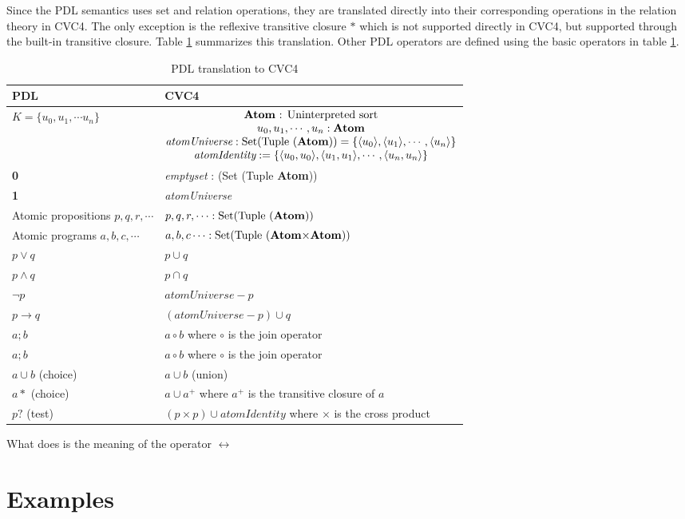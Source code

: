 \documentclass[12pt,a4paper]{article}
\begin{document}
Since the PDL semantics uses set and relation operations, they are translated directly into their corresponding operations in the relation theory in CVC4. The only exception is the reflexive transitive closure $*$ which is not supported directly in CVC4, but supported through the built-in transitive closure. Table \ref{tab:translation} summarizes this translation. Other PDL operators are defined using the basic operators in table \ref{tab:translation}. 

\begin{table}
\begin{center}
\begin{tabular}{ll} 
\toprule
PDL & CVC4 \\    
\midrule    
$K=\lbrace u_0, u_1, \cdots u_n \rbrace$ &  
$\begin{matrix}
\text{\textbf{Atom} : \text{Uninterpreted sort}} \\
u_0, u_1, \cdots, u_n: \textbf{Atom} \\
\textit{atomUniverse}: \text{Set(Tuple (\textbf{Atom}))} = \lbrace \langle u_0 \rangle, \langle u_1 \rangle, \cdots , \langle u_n \rangle \rbrace \\
\textit{atomIdentity}:  = \lbrace \langle u_0, u_0 \rangle, \langle u_1, u_1 \rangle, \cdots , \langle u_n, u_n \rangle \rbrace \\
\end{matrix}$ \\ \midrule   
\textbf{0} & \textit{emptyset} : (Set (Tuple \textbf{Atom})) \\
\textbf{1} & \textit{atomUniverse} \\
Atomic propositions $p, q, r, \cdots$ & $p, q, r, \cdots : \text{Set(Tuple (\textbf{Atom}))}$ \\
Atomic programs $a, b, c, \cdots$ & $a, b, c \cdots : \text{Set(Tuple (\textbf{Atom}$\times$\textbf{Atom}))}$ \\
$p \vee q$ & $p \cup q$ \\
$p \wedge q$ & $p \cap q$ \\
$\neg p$ & $\textit{atomUniverse} - p$ \\
$p \rightarrow q$ & $(\textit{atomUniverse}- p)\cup q$ \\
$a;b$ & $a \circ b$ where $\circ$ is the join operator\\
$a;b$ & $a \circ b$ where $\circ$ is the join operator\\
$a \cup b$ (choice) & $a \cup b$ (union)\\
$a*$ (choice) & $a \cup a^+$  where $a^+$ is the transitive closure of $a$\\
$p?$ (test) & $(p \times p) \cup \textit{atomIdentity}$ where $\times$ is the cross product\\
\bottomrule
\end{tabular}
\end{center}
\caption{PDL translation to CVC4} \label{tab:translation}
\end{table}

What does is the meaning of the operator $\leftrightarrow$

\section{Examples}






\end{document}
